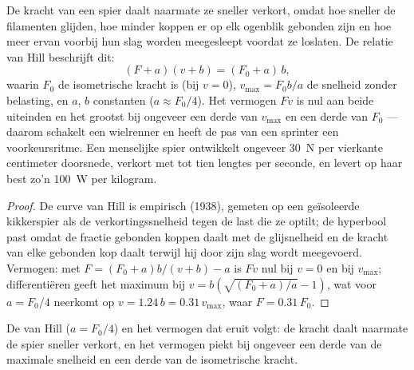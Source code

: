 \begin{theorem}\label{thm:b2:muscle-movement:hill}
De kracht van een spier daalt naarmate ze sneller verkort, omdat hoe sneller
de filamenten glijden, hoe minder koppen er op elk ogenblik gebonden zijn en
hoe meer ervan voorbij hun slag worden meegesleept voordat ze loslaten. De
relatie van Hill beschrijft dit:
\[
(F + a)(v + b) = (F_0 + a)\,b,
\]
waarin $F_0$ de isometrische kracht is (bij $v = 0$), $v_{\max} =
F_0 b/a$ de snelheid zonder belasting, en $a$, $b$ constanten ($a \approx
F_0/4$). Het vermogen $Fv$ is nul aan beide uiteinden en het grootst bij
ongeveer een derde van $v_{\max}$ en een derde van $F_0$ --- daarom schakelt
een wielrenner en heeft de pas van een sprinter een voorkeursritme. Een
menselijke spier ontwikkelt ongeveer \qty{30}{N} per vierkante centimeter
doorsnede, verkort met tot tien lengtes per seconde, en levert op haar best
zo'n \qty{100}{W} per kilogram.
\end{theorem}
\begin{proof}
De curve van Hill is empirisch (1938), gemeten op een geïsoleerde
kikkerspier als de verkortingssnelheid tegen de last die ze optilt; de
hyperbool past omdat de fractie gebonden koppen daalt met de glijsnelheid en
de kracht van elke gebonden kop daalt terwijl hij door zijn slag wordt
meegevoerd. Vermogen: met $F = (F_0 + a)b/(v + b) - a$ is $Fv$ nul bij
$v = 0$ en bij $v_{\max}$; differentiëren geeft het maximum bij
$v = b(\sqrt{(F_0 + a)/a} - 1)$, wat voor $a = F_0/4$ neerkomt op $v =
1.24\,b = 0.31\,v_{\max}$, waar $F = 0.31\,F_0$.
\end{proof}

\begin{omfigure}

{\small De  van Hill ($a = F_0/4$) en het vermogen dat
eruit volgt: de kracht daalt naarmate de spier sneller verkort, en het
vermogen piekt bij ongeveer een derde van de maximale snelheid en een derde
van de isometrische kracht.}
\end{omfigure}

